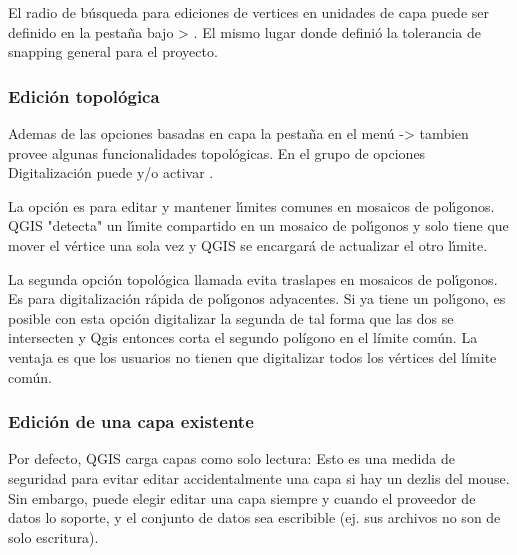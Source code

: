 El radio de b\'usqueda para ediciones de vertices en unidades de capa puede ser definido en la
pesta\~na  bajo  >
. El mismo lugar donde defini\'o la
tolerancia de snapping general para el proyecto.

\subsubsection{Edici\'on topol\'ogica}

Ademas de las opciones basadas en capa la pesta\~na  en el men\'u 
 ->  
tambien provee algunas funcionalidades topol\'ogicas. 
En el grupo de opciones Digitalizaci\'on puede  y/o activar 
.


La opci\'on  es para editar y mantener 
l\'{\i}mites comunes en mosaicos de pol\'{\i}gonos. QGIS "detecta" un l\'{\i}mite compartido en 
un mosaico de pol\'{\i}gonos y solo tiene que mover el v\'ertice una sola vez y QGIS se encargar\'a 
de actualizar el otro l\'{\i}mite.


La segunda opci\'on topol\'ogica llamada  
evita traslapes en mosaicos de pol\'{\i}gonos. Es para digitalizaci\'on r\'apida de pol\'{\i}gonos adyacentes. 
Si ya tiene un pol\'{\i}gono, es posible con esta opci\'on digitalizar la segunda 
de tal forma que las dos se intersecten y Qgis entonces corta el segundo pol\'{i}gono en el l\'{i}mite com\'un. 
La ventaja es que los usuarios no tienen que digitalizar todos los v\'ertices del l\'{i}mite com\'un.

\subsubsection{Edici\'on de una capa existente}
\label{sec:edit_existing_layer}

Por defecto, QGIS carga capas como solo lectura: Esto es una medida de seguridad
para evitar editar accidentalmente una capa si hay un dezlis del mouse.
Sin embargo, puede elegir editar una capa siempre y cuando el proveedor de datos lo soporte,
y el conjunto de datos sea escribible (ej. sus archivos no son de solo escritura).

